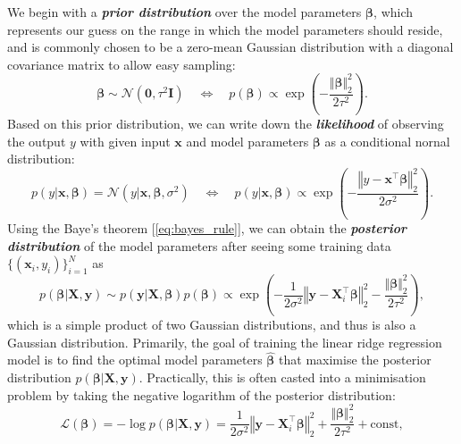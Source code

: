 We begin with a \emph{\textbf{prior distribution}} over the model parameters $\boldsymbol{\beta}$, which represents our guess on the range in which the model parameters should reside, and is commonly chosen to be a zero-mean Gaussian distribution with a diagonal covariance matrix to allow easy sampling:
\begin{equation}
    \label{eq:linear_ridge_param_prior}
    \boldsymbol{\beta}\sim \mathcal{N}(\bm{0},\tau^2\bm{I})\quad \Longleftrightarrow \quad p(\boldsymbol{\beta})\propto\exp\left(-\frac{\Vert\boldsymbol{\beta}\Vert_2^2}{2\tau^2}\right).
\end{equation}
Based on this prior distribution, we can write down the \textbf{\emph{likelihood}} of observing the output $y$ with given input $\bm{x}$ and model parameters $\boldsymbol{\beta}$ as a conditional nornal distribution:
\begin{equation}    \label{eq:linear_ridge_likelihood}
    p(y|\bm{x},\boldsymbol{\beta}) = \mathcal{N}(y|\bm{x},\boldsymbol{\beta},\sigma^2) \quad \Longleftrightarrow \quad p(y|\bm{x},\boldsymbol{\beta})\propto \exp\left(-\frac{\left\Vert y-\bm{x}^\top\boldsymbol{\beta}\right\Vert_2^2}{2\sigma^2}\right).        
\end{equation}
Using the Baye's theorem [\cref{eq:bayes_rule}], we can obtain the \textbf{\emph{posterior distribution}} of the model parameters after seeing some training data $\{(\bm{x}_i,y_i)\}_{i=1}^{N}$ as
\begin{equation}    \label{eq:linear_ridge_param_posterior}
    p(\boldsymbol{\beta}|\bm{X},\bm{y}) \sim p(\bm{y}|\bm{X},\boldsymbol{\beta})p(\boldsymbol{\beta})   \propto \exp\left(-\frac{1}{2\sigma^2}\left\Vert \bm{y}-\bm{X}_i^\top\boldsymbol{\beta}\right\Vert_2^2 - \frac{\Vert\boldsymbol{\beta}\Vert_2^2}{2\tau^2}\right),
\end{equation}
which is a simple product of two Gaussian distributions, and thus is also a Gaussian distribution. Primarily, the goal of training the linear ridge regression model is to find the optimal model parameters $\hat{\boldsymbol{\beta}}$ that maximise the posterior distribution $p(\boldsymbol{\beta}|\bm{X},\bm{y})$. Practically, this is often casted into a minimisation problem by taking the negative logarithm of the posterior distribution:
\begin{equation}
    \label{eq:log_likelihood_linear_ridge}
    \mathcal{L}(\boldsymbol{\beta})=-\log p(\boldsymbol{\beta}|\bm{X},\bm{y}) = \frac{1}{2\sigma^2} \left\Vert \bm{y}-\bm{X}_i^\top\boldsymbol{\beta}\right\Vert_2^2 + \frac{\Vert\boldsymbol{\beta}\Vert_2^2}{2\tau^2}+\mbox{const},
\end{equation}
